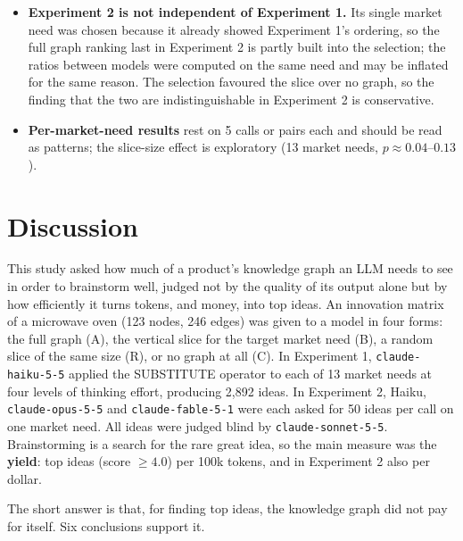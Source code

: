 \begin{itemize}
\item
  \textbf{Experiment 2 is not independent of Experiment 1.} Its single market need was chosen because it already showed Experiment 1's ordering, so the full graph ranking last in Experiment 2 is partly built into the selection; the ratios between models were computed on the same need and may be inflated for the same reason. The selection favoured the slice over no graph, so the finding that the two are indistinguishable in Experiment 2 is conservative.
\item
  \textbf{Per-market-need results} rest on 5 calls or pairs each and should be read as patterns; the slice-size effect is exploratory (13 market needs, $p \approx 0.04$--$0.13$).
\end{itemize}

\hypertarget{discussion-and-conclusion}{%
\section{Discussion}\label{discussion-and-conclusion}}



This study asked how much of a product's knowledge graph an LLM needs to see in order to brainstorm well, judged not by the quality of its output alone but by how efficiently it turns tokens, and money, into top ideas. An innovation matrix of a microwave oven (123 nodes, 246 edges) was given to a model in four forms: the full graph (A), the vertical slice for the target market need (B), a random slice of the same size (R), or no graph at all (C). In Experiment 1, \texttt{claude-haiku-5-5} applied the SUBSTITUTE operator to each of 13 market needs at four levels of thinking effort, producing 2,892 ideas. In Experiment 2, Haiku, \texttt{claude-opus-5-5} and \texttt{claude-fable-5-1} were each asked for 50 ideas per call on one market need. All ideas were judged blind by \texttt{claude-sonnet-5-5}. Brainstorming is a search for the rare great idea, so the main measure was the \textbf{yield}: top ideas (score $\ge 4.0$) per 100k tokens, and in Experiment 2 also per dollar.

The short answer is that, for finding top ideas, the knowledge graph did not pay for itself. Six conclusions support it.

